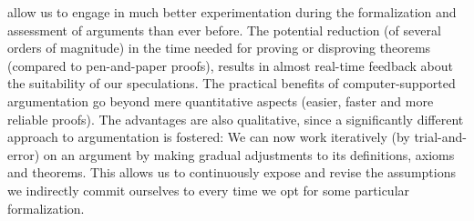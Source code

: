 \begin{isabellebody}
\begin{isamarkuptext}
{allow us to engage in much better experimentation during the formalization and assessment of arguments than ever before.
The potential reduction (of several orders of magnitude)
in the time needed for proving or disproving theorems (compared to pen-and-paper proofs), results in almost real-time
feedback about the suitability of our speculations. The practical benefits of computer-supported argumentation go beyond
mere quantitative aspects (easier, faster and more reliable proofs). The advantages are also qualitative,
since a significantly different approach to argumentation is fostered: We can now work iteratively (by trial-and-error)
on an argument by making gradual adjustments to its definitions, axioms and theorems. This allows us to continuously
expose and revise the assumptions we indirectly commit ourselves to every time we opt for some particular formalization.
}%
\end{isamarkuptext}\isamarkuptrue%
%
%
%
%
%
%
%
\end{isabellebody}%
